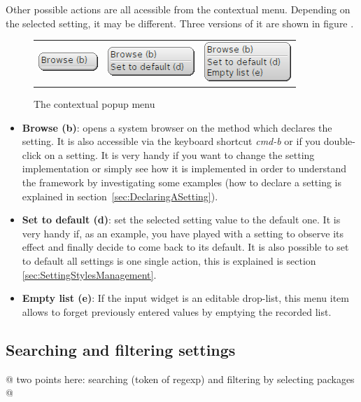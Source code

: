 \documentclass[a4paper,10pt,twoside]{book}
\begin{document}
Other possible actions are all acessible from the contextual menu.
Depending on the selected setting, it may be different. Three versions of it are shown in figure .
\begin{figure}[tbh]
\begin{center}
\begin{tabular}{ccc}
\includegraphics[scale=0.5]{popup0.png} & 
	\includegraphics[scale=0.5]{popup1.png} & 
	\includegraphics[scale=0.5]{popup2.png} \\ 
\end{tabular} 
\caption{The contextual popup menu}
\end{center}
\end{figure}
\begin{itemize}
\item \textbf{Browse (b)}: opens a system browser on the method which declares the setting. It is also accessible via the keyboard shortcut \textit{cmd-b} or if you double-click on a setting. It is very handy if you want to change the setting implementation or simply see how it is implemented in order to understand the framework by investigating some examples (how to declare a setting is explained in section~\ref{sec:DeclaringASetting}).
\item \textbf{Set to default (d)}: set the selected setting value to the default one. It is very handy if, as an example, you have played with a setting to observe its effect and finally decide to come back to its default. It is also possible to set to default all settings is one single action, this is explained is section \ref{sec:SettingStylesManagement}.
\item \textbf{Empty list (e)}: If the input widget is an editable drop-list, this menu item allows to forget previously entered values by emptying the recorded list.
\end{itemize}

\subsection{Searching and filtering settings}
@ two points here: searching (token of regexp) and filtering by selecting packages @
\end{document}
